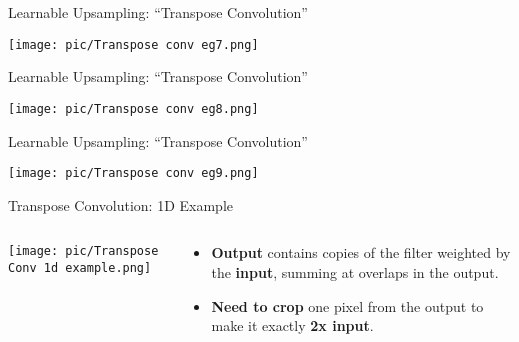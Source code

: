 \documentclass[serif, aspectratio=169]{beamer}
\begin{document}
\begin{frame}{Learnable Upsampling: “Transpose Convolution”}

    \begin{center}
        \texttt{[image: pic/Transpose conv eg7.png]} 
    \end{center}
\end{frame}

\begin{frame}{Learnable Upsampling: “Transpose Convolution”}

    \begin{center}
        \texttt{[image: pic/Transpose conv eg8.png]} 
    \end{center}
\end{frame}

\begin{frame}{Learnable Upsampling: “Transpose Convolution”}

    \begin{center}
        \texttt{[image: pic/Transpose conv eg9.png]} 
    \end{center}
\end{frame}



\begin{frame}{Transpose Convolution: 1D Example}
    \begin{columns}[T]
        \begin{column}{0.75\textwidth}
            \centering
            \texttt{[image: pic/Transpose Conv 1d example.png]}
        \end{column}

        \begin{column}{0.35\textwidth}
            \small
            \vspace{1cm}
            \begin{itemize}
                \item \textbf{Output} contains copies of the filter weighted by the \textbf{input}, summing at overlaps in the output.
                \item \textbf{Need to crop} one pixel from the output to make it exactly \textbf{2x input}.
            \end{itemize}
        \end{column}
    \end{columns}
\end{frame}
\end{document}
